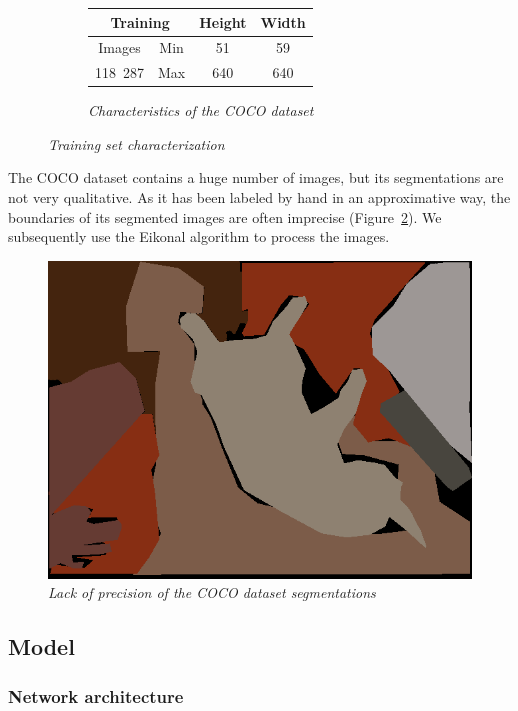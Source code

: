 \documentclass{article}
\begin{document}
\begin{figure}[!ht]
\begin{subfigure}{.49\linewidth}
\begin{tabular}{|c||c|c|c|}
                    \hline
                    \multicolumn{2}{|c|}{Training} & Height & Width \\
                    \hline
                    \hline
                    Images & Min & 51 & 59 \\
                    \hline
                    118~287 & Max & 640 & 640 \\
                    \hline
                \end{tabular}
                \caption{\textit{Characteristics of the COCO dataset}}
            \end{subfigure}
            \caption{\textit{Training set characterization}}
            \label{fig:train}
        \end{figure}

        The COCO dataset contains a huge number of images, but its segmentations are not very qualitative. As it has been labeled by hand in an approximative way, the boundaries of its segmented images are often imprecise (Figure~\ref{fig:imprecise}). We subsequently use the Eikonal algorithm to process the images.

        \begin{figure}[!ht]
            \centering
            \includegraphics[width=0.3\linewidth]{pics/img_segm_coco.png}
            \caption{\textit{Lack of precision of the COCO dataset segmentations}}
            \label{fig:imprecise}
        \end{figure}


    \subsection{Model}

        \subsubsection{Network architecture}
\end{document}
